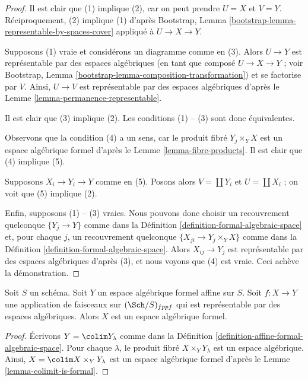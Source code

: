 \begin{proof}
Il est clair que (1) implique (2), car on peut prendre $U = X$ et $V = Y$.
Réciproquement, (2) implique (1) d'après
Bootstrap, Lemma \ref{bootstrap-lemma-representable-by-spaces-cover}
appliqué à $U \to X \to Y$.

\medskip\noindent
Supposons (1) vraie et considérons un diagramme comme en (3).
Alors $U \to Y$ est représentable par des espaces algébriques
(en tant que composé $U \to X \to Y$ ; voir
Bootstrap, Lemma \ref{bootstrap-lemma-composition-transformation})
et se factorise par $V$. Ainsi, $U \to V$ est représentable par des
espaces algébriques d'après le Lemme \ref{lemma-permanence-representable}.

\medskip\noindent
Il est clair que (3) implique (2). Les conditions (1) -- (3) sont donc équivalentes.

\medskip\noindent
Observons que la condition (4) a un sens, car le produit fibré
$Y_j \times_Y X$ est un espace algébrique formel d'après le
Lemme \ref{lemma-fibre-products}.
Il est clair que (4) implique (5).

\medskip\noindent
Supposons $X_i \to Y_i \to Y$ comme en (5). Posons alors
$V = \coprod Y_i$ et $U = \coprod X_i$ ; on voit que
(5) implique (2).

\medskip\noindent
Enfin, supposons (1) -- (3) vraies.
Nous pouvons donc choisir un recouvrement quelconque $\{Y_j \to Y\}$ comme dans la
Définition \ref{definition-formal-algebraic-space}
et, pour chaque $j$, un recouvrement quelconque $\{X_{ji} \to Y_j \times_Y X\}$ comme dans la
Définition \ref{definition-formal-algebraic-space}.
Alors $X_{ij} \to Y_j$ est représentable par des espaces algébriques d'après (3),
et nous voyons que (4) est vraie. Ceci achève la démonstration.
\end{proof}

\begin{lemma}
\label{lemma-algebraic-space-over-affine-formal}
Soit $S$ un schéma. Soit $Y$ un espace algébrique formel affine sur $S$.
Soit $f : X \to Y$ une application de faisceaux sur $(\Sch/S)_{fppf}$ qui est
représentable par des espaces algébriques. Alors $X$ est un espace
algébrique formel.
\end{lemma}

\begin{proof}
Écrivons $Y = \colim Y_\lambda$ comme dans la
Définition \ref{definition-affine-formal-algebraic-space}.
Pour chaque $\lambda$, le produit fibré
$X \times_Y Y_\lambda$ est un espace algébrique.
Ainsi, $X = \colim X \times_Y Y_\lambda$ est un espace
algébrique formel d'après le Lemme \ref{lemma-colimit-is-formal}.
\end{proof}


